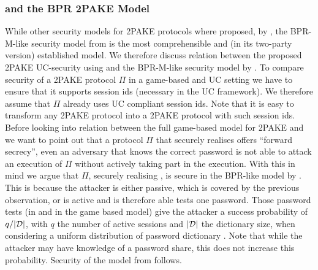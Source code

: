 \subsubsection{\FTWOPAKE and the BPR 2PAKE Model}
While other security models for \ac{2PAKE} protocols where proposed, \eg by \citet{SzydloK05}, the \ac{BPR-M}-like security model from \citet{Katz2012a} is the most comprehensible and (in its two-party version) established model.
We therefore discuss relation between the proposed \ac{2PAKE} \ac{UC}-security using \FTWOPAKE and the \ac{BPR-M}-like security model by \citet{Katz2012a}.
To compare security of a \ac{2PAKE} protocol $\Pi$ in a game-based and \ac{UC} setting we have to ensure that it supports session ids (necessary in the \ac{UC} framework).
We therefore assume that $\Pi$ already uses \ac{UC} compliant session ids.
Note that it is easy to transform any \ac{2PAKE} protocol into a \ac{2PAKE} protocol with such session ids.
Before looking into relation between the full game-based model for \ac{2PAKE} and \FTWOPAKE we want to point out that a protocol $\Pi$ that securely realises \FTWOPAKE offers ``forward secrecy'', \ie even an adversary that knows the correct password is not able to attack an execution of $\Pi$ without actively taking part in the execution.
With this in mind we argue that $\Pi$, securely realising \FTWOPAKE, is secure in the BPR-like model by \citet{Katz2012a}.
This is because the attacker is either passive, which is covered by the previous observation, or is active and is therefore able tests one password.
Those password tests (\TestPwd in \FTWOPAKE and \Send in the game based model) give the attacker a success probability of $q/|\mathcal{D}|$, with $q$ the number of active sessions and $|\mathcal{D}|$ the dictionary size, when considering a uniform distribution of password dictionary \cD.
Note that while the attacker may have knowledge of a password share, this does not increase this probability.
Security of the model from \citet{Katz2012a} follows.


